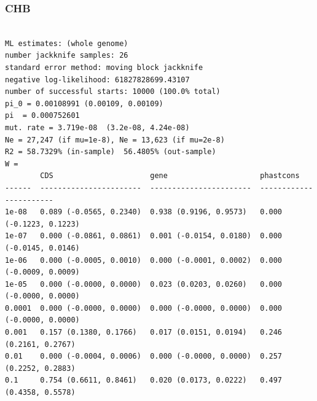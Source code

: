 \documentclass[11pt]{article}
\begin{document}
\subsubsection*{CHB}
\begin{minipage}{\linewidth}\begin{footnotesize}
\begin{verbatim}

ML estimates: (whole genome)
number jackknife samples: 26
standard error method: moving block jackknife
negative log-likelihood: 61827828699.43107
number of successful starts: 10000 (100.0% total)
pi_0 = 0.00108991 (0.00109, 0.00109)
pi  = 0.000752601
mut. rate = 3.719e-08  (3.2e-08, 4.24e-08)
Ne = 27,247 (if mu=1e-8), Ne = 13,623 (if mu=2e-8)
R2 = 58.7329% (in-sample)  56.4805% (out-sample)
W = 
        CDS                      gene                     phastcons
------  -----------------------  -----------------------  -----------------------
1e-08   0.089 (-0.0565, 0.2340)  0.938 (0.9196, 0.9573)   0.000 (-0.1223, 0.1223)
1e-07   0.000 (-0.0861, 0.0861)  0.001 (-0.0154, 0.0180)  0.000 (-0.0145, 0.0146)
1e-06   0.000 (-0.0005, 0.0010)  0.000 (-0.0001, 0.0002)  0.000 (-0.0009, 0.0009)
1e-05   0.000 (-0.0000, 0.0000)  0.023 (0.0203, 0.0260)   0.000 (-0.0000, 0.0000)
0.0001  0.000 (-0.0000, 0.0000)  0.000 (-0.0000, 0.0000)  0.000 (-0.0000, 0.0000)
0.001   0.157 (0.1380, 0.1766)   0.017 (0.0151, 0.0194)   0.246 (0.2161, 0.2767)
0.01    0.000 (-0.0004, 0.0006)  0.000 (-0.0000, 0.0000)  0.257 (0.2252, 0.2883)
0.1     0.754 (0.6611, 0.8461)   0.020 (0.0173, 0.0222)   0.497 (0.4358, 0.5578)
\end{verbatim}
\end{footnotesize}\end{minipage}
\end{document}
